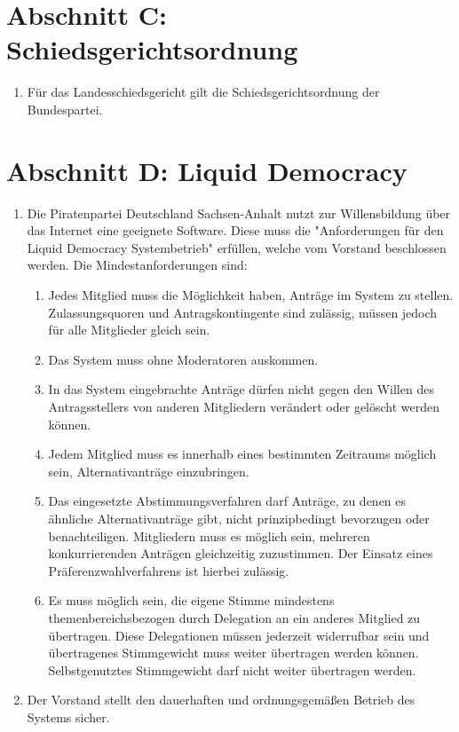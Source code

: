 \documentclass[draft,a4paper,10pt]{article}
\begin{document}
\section{Abschnitt C: Schiedsgerichtsordnung}
\begin{enumerate}
\item Für das Landesschiedsgericht gilt die Schiedsgerichtsordnung der
Bundespartei.
\end{enumerate}


\section{Abschnitt D: Liquid Democracy}
\begin{enumerate}
\item Die Piratenpartei Deutschland Sachsen-Anhalt nutzt zur Willensbildung über
das Internet eine geeignete Software. Diese muss die "Anforderungen für den
Liquid Democracy Systembetrieb" erfüllen, welche vom Vorstand beschlossen
werden.
Die Mindestanforderungen sind:
\begin{enumerate}
\item Jedes Mitglied muss die Möglichkeit haben, Anträge im System zu stellen.
Zulassungsquoren und Antragskontingente sind zulässig, müssen jedoch für alle
Mitglieder gleich sein.
\item Das System muss ohne Moderatoren auskommen.
\item In das System eingebrachte Anträge dürfen nicht gegen den Willen des
Antragsstellers von anderen Mitgliedern verändert oder gelöscht werden können.
\item Jedem Mitglied muss es innerhalb eines bestimmten Zeitraums möglich sein,
Alternativanträge einzubringen.
\item Das eingesetzte Abstimmungsverfahren darf Anträge, zu denen es ähnliche
Alternativanträge gibt, nicht prinzipbedingt bevorzugen oder benachteiligen.
Mitgliedern muss es möglich sein, mehreren konkurrierenden Anträgen gleichzeitig
zuzustimmen. Der Einsatz eines Präferenzwahlverfahrens ist hierbei zulässig.
\item Es muss möglich sein, die eigene Stimme mindestens themenbereichsbezogen
durch Delegation an ein anderes Mitglied zu übertragen. Diese Delegationen
müssen jederzeit widerrufbar sein und übertragenes Stimmgewicht muss weiter
übertragen werden können. Selbstgenutztes Stimmgewicht darf nicht weiter
übertragen werden.
\end{enumerate}

\item Der Vorstand stellt den dauerhaften und ordnungsgemäßen Betrieb des
Systems sicher.


\end{enumerate}
\end{document}
